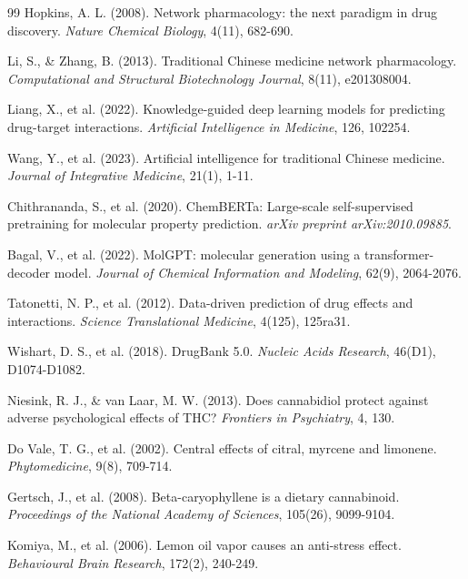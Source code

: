\documentclass[11pt,a4paper]{article}
\begin{document}
\begin{thebibliography}{99}
 Hopkins, A. L. (2008). Network pharmacology: the next paradigm in drug discovery. \textit{Nature Chemical Biology}, 4(11), 682-690.

 Li, S., \& Zhang, B. (2013). Traditional Chinese medicine network pharmacology. \textit{Computational and Structural Biotechnology Journal}, 8(11), e201308004.

 Liang, X., et al. (2022). Knowledge-guided deep learning models for predicting drug-target interactions. \textit{Artificial Intelligence in Medicine}, 126, 102254.

 Wang, Y., et al. (2023). Artificial intelligence for traditional Chinese medicine. \textit{Journal of Integrative Medicine}, 21(1), 1-11.

 Chithrananda, S., et al. (2020). ChemBERTa: Large-scale self-supervised pretraining for molecular property prediction. \textit{arXiv preprint arXiv:2010.09885}.

 Bagal, V., et al. (2022). MolGPT: molecular generation using a transformer-decoder model. \textit{Journal of Chemical Information and Modeling}, 62(9), 2064-2076.

 Tatonetti, N. P., et al. (2012). Data-driven prediction of drug effects and interactions. \textit{Science Translational Medicine}, 4(125), 125ra31.

 Wishart, D. S., et al. (2018). DrugBank 5.0. \textit{Nucleic Acids Research}, 46(D1), D1074-D1082.

 Niesink, R. J., \& van Laar, M. W. (2013). Does cannabidiol protect against adverse psychological effects of THC? \textit{Frontiers in Psychiatry}, 4, 130.

 Do Vale, T. G., et al. (2002). Central effects of citral, myrcene and limonene. \textit{Phytomedicine}, 9(8), 709-714.

 Gertsch, J., et al. (2008). Beta-caryophyllene is a dietary cannabinoid. \textit{Proceedings of the National Academy of Sciences}, 105(26), 9099-9104.

 Komiya, M., et al. (2006). Lemon oil vapor causes an anti-stress effect. \textit{Behavioural Brain Research}, 172(2), 240-249.

\end{thebibliography}
\end{document}
